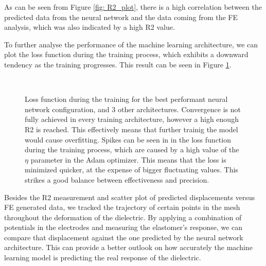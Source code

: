 \pagebreak

As can be seen from Figure \ref{fig: R2_plot}, there is a high correlation between the predicted data from the neural network and the data coming from the FE analysis, which was also indicated by a high R2 value.

To further analyse the performance of the machine learning architecture, we can plot the loss function during the training process, which exhibits a downward tendency as the training progresses. This result can be seen in Figure \ref{fig: losses}. 


\begin{figure}
  \begin{center}
     \qquad
     \\
     \qquad
  \end{center}
  \caption{Loss function during the training for the best performant neural network configuration, and 3 other architectures. Convergence is not fully achieved in every training architecture, however a high enough R2 is reached. This effectively means that further trainig the model would cause overfitting. Spikes can be seen in in the loss function during the training process, which are caused by a high value of the $\eta$ parameter in the Adam optimizer. This means that the loss is minimized quicker, at the expense of bigger fluctuating values. This strikes a good balance between effectiveness and precision.}
  \label{fig: losses}
\end{figure}


Besides the R2 measurement and scatter plot of predicted displacements versus FE generated data, we tracked the trajectory of certain points in the mesh throughout the deformation of the dielectric. By applying a combination of potentials in the electrodes and measuring the elastomer's response, we can compare that displacement against the one predicted by the neural network architecture. This can provide a better outlook on how accurately the machine learning model is predicting the real response of the dielectric. 



